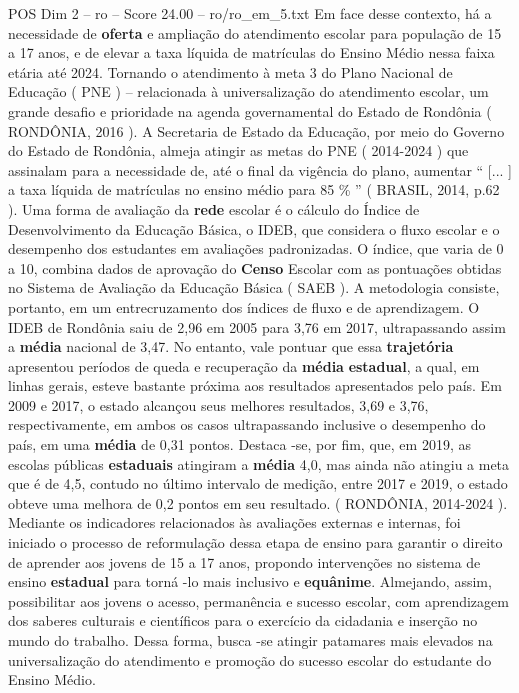 \begin{textsample}{POS Dim 2 – ro – Score 24.00 – ro/ro\_em\_5.txt}
Em face desse contexto, há a necessidade de \textbf{oferta} e ampliação do atendimento escolar para população de 15 a 17 anos, e de elevar a taxa líquida de matrículas do Ensino Médio nessa faixa etária até 2024.
Tornando o atendimento à meta 3 do Plano Nacional de Educação ( PNE ) – relacionada à universalização do atendimento escolar, um grande desafio e prioridade na agenda governamental do Estado de Rondônia ( RONDÔNIA, 2016 ).
A Secretaria de Estado da Educação, por meio do Governo do Estado de Rondônia, almeja atingir as metas do PNE ( 2014-2024 ) que assinalam para a necessidade de, até o final da vigência do plano, aumentar “ [... ] a taxa líquida de matrículas no ensino médio para 85 \% ” ( BRASIL, 2014, p.62 ).
Uma forma de avaliação da \textbf{rede} escolar é o cálculo do Índice de Desenvolvimento da Educação Básica, o IDEB, que considera o fluxo escolar e o desempenho dos estudantes em avaliações padronizadas.
O índice, que varia de 0 a 10, combina dados de aprovação do \textbf{Censo} Escolar com as pontuações obtidas no Sistema de Avaliação da Educação Básica ( SAEB ).
A metodologia consiste, portanto, em um entrecruzamento dos índices de fluxo e de aprendizagem.
O IDEB de Rondônia saiu de 2,96 em 2005 para 3,76 em 2017, ultrapassando assim a \textbf{média} nacional de 3,47.
No entanto, vale pontuar que essa \textbf{trajetória} apresentou períodos de queda e recuperação da \textbf{média} \textbf{estadual}, a qual, em linhas gerais, esteve bastante próxima aos resultados apresentados pelo país.
Em 2009 e 2017, o estado alcançou seus melhores resultados, 3,69 e 3,76, respectivamente, em ambos os casos ultrapassando inclusive o desempenho do país, em uma \textbf{média} de 0,31 pontos.
Destaca -se, por fim, que, em 2019, as escolas públicas \textbf{estaduais} atingiram a \textbf{média} 4,0, mas ainda não atingiu a meta que é de 4,5, contudo no último intervalo de medição, entre 2017 e 2019, o estado obteve uma melhora de 0,2 pontos em seu resultado. ( RONDÔNIA, 2014-2024 ).
Mediante os indicadores relacionados às avaliações externas e internas, foi iniciado o processo de reformulação dessa etapa de ensino para garantir o direito de aprender aos jovens de 15 a 17 anos, propondo intervenções no sistema de ensino \textbf{estadual} para torná -lo mais inclusivo e \textbf{equânime}.
Almejando, assim, possibilitar aos jovens o acesso, permanência e sucesso escolar, com aprendizagem dos saberes culturais e científicos para o exercício da cidadania e inserção no mundo do trabalho.
Dessa forma, busca -se atingir patamares mais elevados na universalização do atendimento e promoção do sucesso escolar do estudante do Ensino Médio.

\end{textsample}
